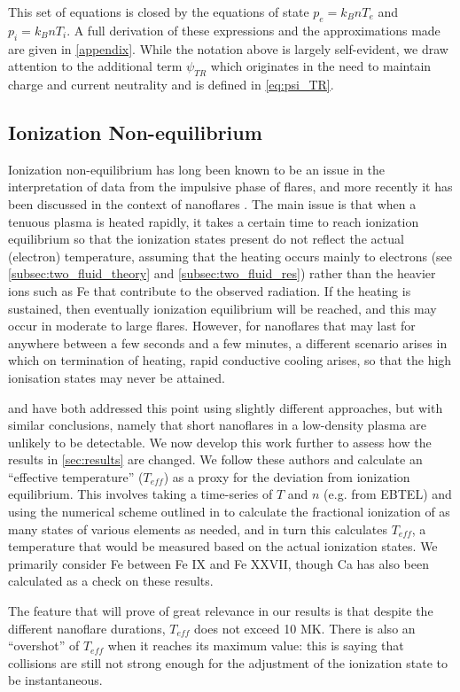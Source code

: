 \documentclass[apj]{emulateapj}
\begin{document}
	This set of equations is closed by the equations of state $p_e=k_BnT_e$ and $p_i=k_BnT_i$. A full derivation of these expressions and the approximations made are given in \autoref{appendix}. While the notation above is largely self-evident, we draw attention to the additional term $\psi_{TR}$ which originates in the need to maintain charge and current neutrality and is defined in \autoref{eq:psi_TR}.
	\subsection{Ionization Non-equilibrium}
	\label{subsec:nei_theory}
	\par Ionization non-equilibrium has long been known to be an issue in the interpretation of data from the impulsive phase of flares, and more recently it has been discussed in the context of nanoflares \citep{bradshaw_explosive_2006,reale_nonequilibrium_2008}. The main issue is that when a tenuous plasma is heated rapidly, it takes a certain time to reach ionization equilibrium so that the ionization states present do not reflect the actual (electron) temperature, assuming that the heating occurs mainly to electrons (see \autoref{subsec:two_fluid_theory} and \autoref{subsec:two_fluid_res}) rather than the heavier ions such as Fe that contribute to the observed radiation. If the heating is sustained, then eventually ionization equilibrium will be reached, and this may occur in moderate to large flares. However, for nanoflares that may last for anywhere between a few seconds and a few minutes, a different scenario arises in which on termination of heating, rapid conductive cooling arises, so that the high ionisation states may never be attained.
	\par \citet{reale_nonequilibrium_2008} and \citet{bradshaw_numerical_2009} have both addressed this point using slightly different approaches, but with similar conclusions, namely that short nanoflares in a low-density plasma are unlikely to be detectable. We now develop this work further to assess how the results in \autoref{sec:results} are changed. We follow these authors and calculate an ``effective temperature'' ($T_{eff}$) as a proxy for the deviation from ionization equilibrium. This involves taking a time-series of $T$ and $n$ (e.g. from EBTEL) and using the numerical scheme outlined in \citet{bradshaw_numerical_2009} to calculate the fractional ionization of as many states of various elements as needed, and in turn this calculates $T_{eff}$, a temperature that would be measured based on the actual ionization states. We primarily consider Fe between Fe IX and Fe XXVII, though Ca has also been calculated as a check on these results.
	\par The feature that will prove of great relevance in our results is that despite the different nanoflare durations, $T_{eff}$ does not exceed 10 MK. There is also an ``overshot'' of $T_{eff}$ when it reaches its maximum value: this is saying that collisions are still not strong enough for the adjustment of the ionization state to be instantaneous.
\end{document}
